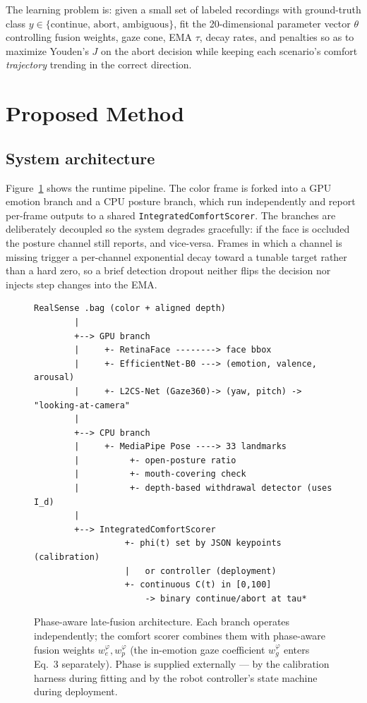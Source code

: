 \documentclass{article}
\newcommand{\code}[1]{\texttt{\small #1}}
\begin{document}
The learning problem is: given a small set of labeled recordings with ground-truth class $y \in \{\text{continue, abort, ambiguous}\}$, fit the 20-dimensional parameter vector $\theta$ controlling fusion weights, gaze cone, EMA $\tau$, decay rates, and penalties so as to maximize Youden's $J$ on the abort decision while keeping each scenario's comfort \emph{trajectory} trending in the correct direction.

\section{Proposed Method}

\subsection{System architecture}

Figure~\ref{fig:arch} shows the runtime pipeline. The color frame is forked into a GPU emotion branch and a CPU posture branch, which run independently and report per-frame outputs to a shared \code{IntegratedComfortScorer}. The branches are deliberately decoupled so the system degrades gracefully: if the face is occluded the posture channel still reports, and vice-versa. Frames in which a channel is missing trigger a per-channel exponential decay toward a tunable target rather than a hard zero, so a brief detection dropout neither flips the decision nor injects step changes into the EMA.

\begin{figure}[t]
\centering
\begin{lstlisting}
RealSense .bag (color + aligned depth)
        |
        +--> GPU branch
        |     +- RetinaFace --------> face bbox
        |     +- EfficientNet-B0 ---> (emotion, valence, arousal)
        |     +- L2CS-Net (Gaze360)-> (yaw, pitch) -> "looking-at-camera"
        |
        +--> CPU branch
        |     +- MediaPipe Pose ----> 33 landmarks
        |          +- open-posture ratio
        |          +- mouth-covering check
        |          +- depth-based withdrawal detector (uses I_d)
        |
        +--> IntegratedComfortScorer
                  +- phi(t) set by JSON keypoints (calibration)
                  |   or controller (deployment)
                  +- continuous C(t) in [0,100]
                      -> binary continue/abort at tau*
\end{lstlisting}
\caption{Phase-aware late-fusion architecture. Each branch operates independently; the comfort scorer combines them with phase-aware fusion weights $w_e^\varphi, w_p^\varphi$ (the in-emotion gaze coefficient $w_g^\varphi$ enters Eq.~3 separately). Phase is supplied externally --- by the calibration harness during fitting and by the robot controller's state machine during deployment.}
\label{fig:arch}
\end{figure}
\end{document}
